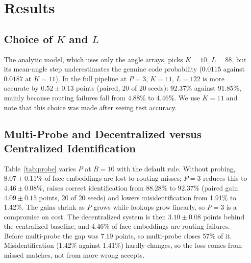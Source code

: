 \documentclass[pdflatex,sn-mathphys-num]{sn-jnl}%
\theoremstyle{thmstyleone}%
\theoremstyle{thmstyletwo}%
\theoremstyle{thmstylethree}%
\begin{document}
\section{Results}
\label{sec:results}

\subsection{Choice of $K$ and $L$}
\label{sec:k1011}

The analytic model, which uses only the angle arrays, picks $K=10$, $L=88$, but its mean-angle step underestimates the genuine code probability ($0.0115$ against $0.0187$ at $K=11$). In the full pipeline at $P=3$, $K=11$, $L=122$ is more accurate by $0.52 \pm 0.13$ points (paired, 20 of 20 seeds): 92.37\% against 91.85\%, mainly because routing failures fall from 4.88\% to 4.46\%. We use $K=11$ and note that this choice was made after seeing test accuracy.

\subsection{Multi-Probe and Decentralized versus Centralized Identification}

Table~\ref{tab:probe} varies $P$ at $B=10$ with the default rule. Without probing, $8.07 \pm 0.11\%$ of face embeddings are lost to routing misses; $P=3$ reduces this to $4.46 \pm 0.08\%$, raises correct identification from $88.28\%$ to $92.37\%$ (paired gain $4.09 \pm 0.15$ points, 20 of 20 seeds) and lowers misidentification from 1.91\% to 1.42\%. The gains shrink as $P$ grows while lookups grow linearly, so $P=3$ is a compromise on cost. The decentralized system is then $3.10 \pm 0.08$ points behind the centralized baseline, and 4.46\% of face embeddings are routing failures. Before multi-probe the gap was 7.19 points, so multi-probe closes 57\% of it. Misidentification (1.42\% against 1.41\%) hardly changes, so the loss comes from missed matches, not from more wrong accepts.
\end{document}

